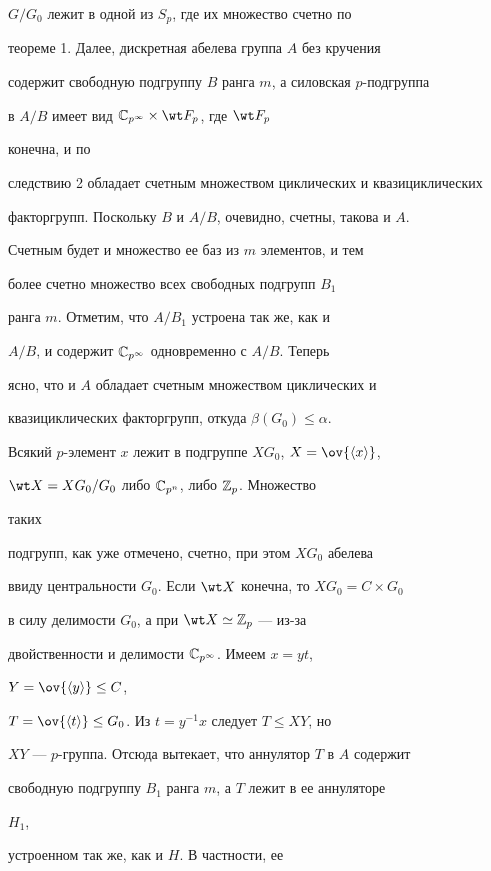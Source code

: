 $G/G_0$ лежит в одной из $S_p$, где их множество счетно по 


теореме 1. Далее, дискретная абелева группа $A$ без кручения 


содержит свободную подгруппу $B$ ранга $m$, а силовская $p$-подгруппа 


в $A/B$ имеет вид $\Bbb C_{p^\infty}\times\wt F_p$, где $\wt F_p$ 


конечна, и по 


следствию 2 обладает счетным множеством циклических и квазициклических 


факторгрупп. Поскольку $B$ и $A/B$, очевидно, счетны, такова и $A$. 


Счетным будет и множество ее баз из $m$ элементов, и тем 


более счетно множество всех свободных подгрупп $B_1$ 


ранга $m$. Отметим, что $A/B_1$ устроена так же, как и  


$A/B$, и содержит $\Bbb C_{p^\infty}$ одновременно с $A/B$. Теперь  


ясно, что и $A$ обладает счетным множеством циклических и 


квазициклических факторгрупп, откуда $\beta(G_0)\le\alpha$. 


 


Всякий $p$-элемент $x$ лежит в подгруппе $XG_0$, $X=\ov{\la x\ra}$, 


$\wt X=XG_0/G_0$ либо $\Bbb C_{p^n}$, либо $\Bbb Z_p$. Множество 


таких 


подгрупп, как уже отмечено, счетно, при этом $XG_0$ абелева  


ввиду центральности $G_0$. Если $\wt X$ конечна, то $XG_0=C\times G_0$ 


в силу делимости $G_0$, а при $\wt X\simeq\Bbb Z_p$ --- из-за


двойственности и делимости $\Bbb C_{p^\infty}$. Имеем $x=yt$, 


$Y=\ov{\la y\ra}\le C$, 


$T=\ov{\la t\ra}\le G_0$. Из $t=y^{-1}x$ следует $T\le XY$, но  


$XY$ --- $p$-группа. Отсюда вытекает, что аннулятор $T$ в $A$ содержит 


свободную подгруппу $B_1$ ранга $m$, а $T$ лежит в ее аннуляторе 


$H_1$, 


устроенном так же, как и $H$. В частности, ее  


